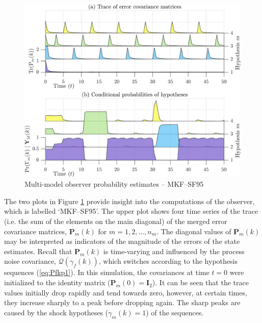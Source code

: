 \begin{figure}[htp]
	\centering
	\includegraphics[width=12cm]{images/rod_MKF_test_sim_MKF_SF95_prob.png}
	\caption{Multi-model observer probability estimates – MKF--SF95}
	\label{fig:rod-obs-sim-test-probs-SF95}
\end{figure}
The two plots in Figure \ref{fig:rod-obs-sim-test-probs-SF95} provide insight into the computations of the observer, which is labelled `MKF--SF95'. The upper plot shows four time series of the trace (i.e. the sum of the elements on the main diagonal) of the merged error covariance matrices, $\mathbf{P}_m(k)$ for $m=1,2,...,n_m$. The diagonal values of $\mathbf{P}_m(k)$ may be interpreted as indicators of the magnitude of the errors of the state estimates. Recall that $\mathbf{P}_m(k)$ is time-varying and influenced by the process noise covariance, $\mathcal{Q}(\gamma_f(k))$, which switches according to the hypothesis sequences (\ref{eq:Pfkp1}). In this simulation, the covariances at time $t=0$ were initialized to the identity matrix ($\mathbf{P}_m(0)=\mathbf{I}_2$). It can be seen that the trace values initially drop rapidly and tend towards zero, however, at certain times, they increase sharply to a peak before dropping again. The sharp peaks are caused by the shock hypotheses ($\gamma_m(k)=1$) of the sequences.

